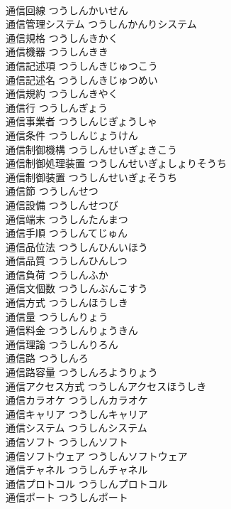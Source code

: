 \documentclass[8pt]{extreport}
\begin{document}
\begin{CJK}{UTF8}{min}
\\	通信回線	つうしんかいせん	
\\	通信管理システム	つうしんかんりシステム	
\\	通信規格	つうしんきかく	
\\	通信機器	つうしんきき	
\\	通信記述項	つうしんきじゅつこう	
\\	通信記述名	つうしんきじゅつめい	
\\	通信規約	つうしんきやく	
\\	通信行	つうしんぎょう	
\\	通信事業者	つうしんじぎょうしゃ	
\\	通信条件	つうしんじょうけん	
\\	通信制御機構	つうしんせいぎょきこう	
\\	通信制御処理装置	つうしんせいぎょしょりそうち	
\\	通信制御装置	つうしんせいぎょそうち	
\\	通信節	つうしんせつ	
\\	通信設備	つうしんせつび	
\\	通信端末	つうしんたんまつ	
\\	通信手順	つうしんてじゅん	
\\	通信品位法	つうしんひんいほう	
\\	通信品質	つうしんひんしつ	
\\	通信負荷	つうしんふか	
\\	通信文個数	つうしんぶんこすう	
\\	通信方式	つうしんほうしき	
\\	通信量	つうしんりょう	
\\	通信料金	つうしんりょうきん	
\\	通信理論	つうしんりろん	
\\	通信路	つうしんろ	
\\	通信路容量	つうしんろようりょう	
\\	通信アクセス方式	つうしんアクセスほうしき	
\\	通信カラオケ	つうしんカラオケ	
\\	通信キャリア	つうしんキャリア	
\\	通信システム	つうしんシステム	
\\	通信ソフト	つうしんソフト	
\\	通信ソフトウェア	つうしんソフトウェア	
\\	通信チャネル	つうしんチャネル	
\\	通信プロトコル	つうしんプロトコル	
\\	通信ポート	つうしんポート	

\end{CJK}
\end{document}
